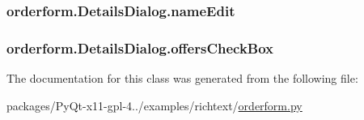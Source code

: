\subsubsection[{name\+Edit}]{\setlength{\rightskip}{0pt plus 5cm}orderform.\+Details\+Dialog.\+name\+Edit}\label{classorderform_1_1DetailsDialog_a9b6181cd105b63af77318a20e6279585}
\hypertarget{classorderform_1_1DetailsDialog_aed67ed52f3566f6f3c232a9a72b39811}{}
\subsubsection[{offers\+Check\+Box}]{\setlength{\rightskip}{0pt plus 5cm}orderform.\+Details\+Dialog.\+offers\+Check\+Box}\label{classorderform_1_1DetailsDialog_aed67ed52f3566f6f3c232a9a72b39811}


The documentation for this class was generated from the following file\+:\begin{DoxyCompactItemize}
\item 
packages/\+Py\+Qt-\/x11-\/gpl-\/4../examples/richtext/\hyperlink{orderform_8py}{orderform.\+py}\end{DoxyCompactItemize}
